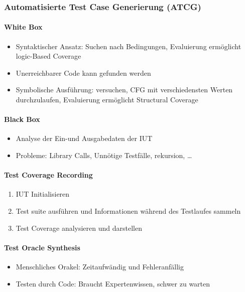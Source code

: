 \documentclass[ngerman,color=3b]{tuda_summary}
\begin{document}
\subsubsection{Automatisierte Test Case Generierung (ATCG)}
\paragraph{White Box}\begin{itemize}
    \item Syntaktischer Ansatz: Suchen nach Bedingungen, Evaluierung ermöglicht logic-Based Coverage
    \item Unerreichbarer Code kann gefunden werden
    \item Symbolische Ausführung: versuchen, CFG mit verschiedensten Werten durchzulaufen, Evaluierung ermöglicht Structural Coverage
\end{itemize}
\vspace*{-1ex}
\paragraph{Black Box}\begin{itemize}
    \item Analyse der Ein-und Ausgabedaten der IUT
    \item Probleme: Library Calls, Unnötige Testfälle, rekursion, \dots
\end{itemize}
\vspace*{-1ex}
\paragraph{Test Coverage Recording}\begin{enumerate}
    \item IUT Initialisieren
    \item Test suite ausführen und Informationen während des Testlaufes sammeln
    \item Test Coverage analysieren und darstellen
\end{enumerate}
\vspace*{-1ex}
\paragraph{Test Oracle Synthesis}\begin{itemize}
    \item Menschliches Orakel: Zeitaufwändig und Fehleranfällig
    \item Testen durch Code: Braucht Expertenwissen, schwer zu warten
\end{itemize}
\vspace*{-1ex}
\end{document}
